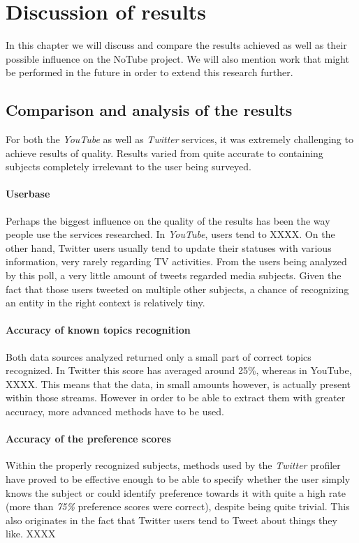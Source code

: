 \section{Discussion of results}
In this chapter we will discuss and compare the results achieved as well as their possible influence on the NoTube project. We will also mention work that might be performed in the future in order to extend this research further.

\subsection{Comparison and analysis of the results}
For both the \textit{YouTube} as well as \textit{Twitter} services, it was extremely challenging to achieve results of
quality. Results varied from quite accurate to containing subjects completely irrelevant to the user being surveyed.

\paragraph{Userbase}
Perhaps the biggest influence on the quality of the results has been the way people use the services researched.
In \textit{YouTube}, users tend to XXXX. On the other hand, Twitter users usually tend to update their statuses
with various information, very rarely regarding TV activities. From the users being analyzed by this poll, a very
little amount of tweets regarded media subjects. Given the fact that those users tweeted on multiple other subjects,
a chance of recognizing an entity in the right context is relatively tiny.

\paragraph{Accuracy of known topics recognition}
Both data sources analyzed returned only a small part of correct topics recognized. In Twitter this score has
averaged around 25\%, whereas in YouTube, XXXX. This means that the data, in small amounts however, is actually present
within those streams. However in order to be able to extract them with greater accuracy, more advanced methods have
to be used.

\paragraph{Accuracy of the preference scores}
Within the properly recognized subjects, methods used by the \textit{Twitter} profiler have proved to be effective enough
to be able to specify whether the user simply knows the subject or could identify preference towards it with quite a high
rate (more than \textit{75\%} preference scores were correct), despite being quite trivial. This also originates in the fact
that Twitter users tend to Tweet about things they like. XXXX


